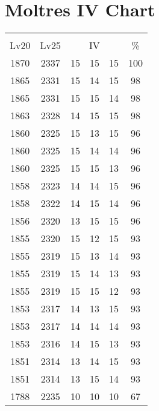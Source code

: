\documentclass{article}%
\begin{document}
%
\normalsize%
\section{Moltres IV Chart}%
\label{sec:Moltres IV Chart}%
\renewcommand{\arraystretch}{1.5}%
\begin{tabular}{|c|c|c|c|c|c|}%
\hline%
\multicolumn{6}{|c|}{\textcolor{white}{ 
\linebreak{Moltres}
}%
\cellcolor{black}}\\%
\multicolumn{1}{|c}{Lv20}&\multicolumn{1}{c|}{Lv25}&\multicolumn{3}{c|}{IV}&\multicolumn{1}{|c|}{\%}\\%
\hline%
\rowcolor{color100}%
1870&2337&15&15&15&100\\%
\hline%
\rowcolor{color98}%
1865&2331&15&14&15&98\\%
\hline%
\rowcolor{color98}%
1865&2331&15&15&14&98\\%
\hline%
\rowcolor{color98}%
1863&2328&14&15&15&98\\%
\hline%
\rowcolor{color96}%
1860&2325&15&13&15&96\\%
\hline%
\rowcolor{color96}%
1860&2325&15&14&14&96\\%
\hline%
\rowcolor{color96}%
1860&2325&15&15&13&96\\%
\hline%
\rowcolor{color96}%
1858&2323&14&14&15&96\\%
\hline%
\rowcolor{color96}%
1858&2322&14&15&14&96\\%
\hline%
\rowcolor{color96}%
1856&2320&13&15&15&96\\%
\hline%
\rowcolor{color93}%
1855&2320&15&12&15&93\\%
\hline%
\rowcolor{color93}%
1855&2319&15&13&14&93\\%
\hline%
\rowcolor{color93}%
1855&2319&15&14&13&93\\%
\hline%
\rowcolor{color93}%
1855&2319&15&15&12&93\\%
\hline%
\rowcolor{color93}%
1853&2317&14&13&15&93\\%
\hline%
\rowcolor{color93}%
1853&2317&14&14&14&93\\%
\hline%
\rowcolor{color93}%
1853&2316&14&15&13&93\\%
\hline%
\rowcolor{color93}%
1851&2314&13&14&15&93\\%
\hline%
\rowcolor{color93}%
1851&2314&13&15&14&93\\%
\hline%
\rowcolor{color91}%
1788&2235&10&10&10&67\\%
\end{tabular}

%
\end{document}
